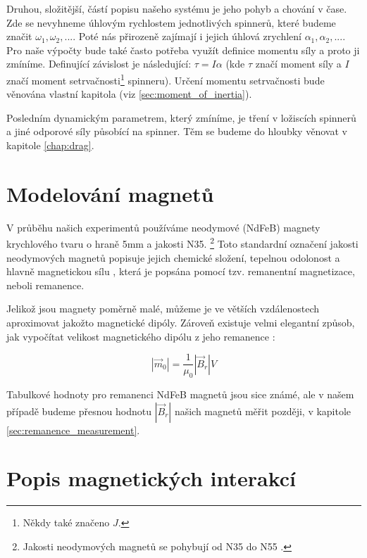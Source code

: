 Druhou, složitější, částí popisu našeho systému je jeho pohyb a chování v čase.
Zde se nevyhneme úhlovým rychlostem jednotlivých spinnerů, které budeme značit $\omega_1, \omega_2,...$.
Poté nás přirozeně zajímají i jejich úhlová zrychlení $\alpha_1, \alpha_2, ...$. Pro naše výpočty bude také často potřeba využít definice momentu síly a proto ji zmíníme. Definující závislost je následující: $\tau = I\alpha$ (kde $\tau$ značí moment síly a $I$ značí moment setrvačnosti\footnote{Někdy také značeno $J$.} spinneru).
Určení momentu setrvačnosti bude věnována vlastní kapitola (viz \autoref{sec:moment_of_inertia}).

Posledním dynamickým parametrem, který zmíníme, je tření v ložiscích spinnerů a jiné odporové síly působící na spinner.
Těm se budeme do hloubky věnovat v kapitole \ref{chap:drag}.

\clearpage

\section{Modelování magnetů}
V průběhu našich experimentů používáme neodymové (NdFeB) magnety krychlového tvaru o hraně 5mm a jakosti N35. \footnote{Jakosti neodymových magnetů se pohybují od N35 do N55 \cite{magnet_grades}.}
Toto standardní označení jakosti neodymových magnetů popisuje jejich chemické složení, tepelnou odolonost a hlavně magnetickou sílu \cite{magnet_grades}, která je popsána pomocí tzv. remanentní magnetizace, neboli remanence.

Jelikož jsou magnety poměrně malé, můžeme je ve větších vzdálenostech aproximovat jakožto magnetické dipóly.
Zároveň existuje velmi elegantní způsob, jak vypočítat velikost magnetického dipólu z jeho remanence \cite{magnetic_torque}:

\begin{equation}
    \label{eq:mag_mom_remanence}
    |\vec{m}_0| = \frac{1}{\mu_0}|\vec{B}_r|V
\end{equation}

Tabulkové hodnoty pro remanenci NdFeB magnetů jsou sice známé, ale v našem případě budeme přesnou hodnotu $|\vec{B}_r|$ našich magnetů měřit později, v kapitole \ref{sec:remanence_measurement}.

\section{Popis magnetických interakcí}

